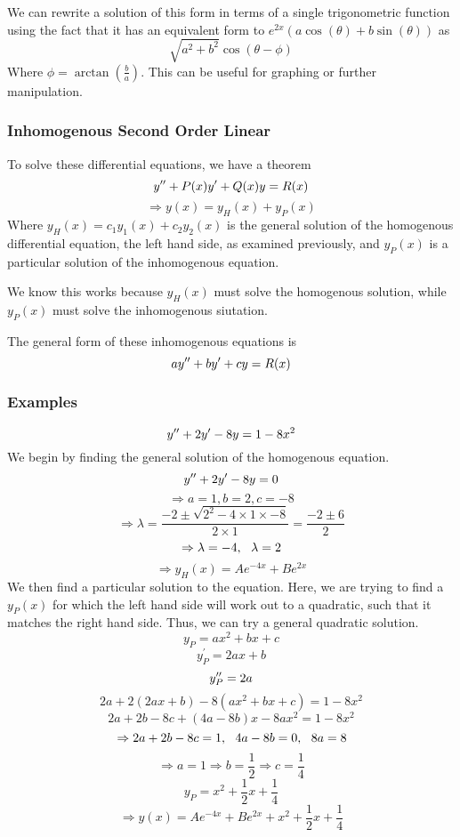 \documentclass[12pt]{report}
\begin{document}
\begin{flushleft}
\bigskip
We can rewrite a solution of this form in terms of a single trigonometric
function using the fact that it has an equivalent form to
\(e^{2x}(a\cos(\theta) + b\sin(\theta))\) as
\[\sqrt{a^2 + b^2}\cos(\theta - \phi)\]
Where \(\phi = \arctan\left(\frac{b}{a}\right)\). This can be useful for
graphing or further manipulation.

\subsubsection*{Inhomogenous Second Order Linear}

To solve these differential equations, we have a theorem
\[y^{\prime\prime} + P(x)y^\prime + Q(x)y = R(x)\]
\[\Rightarrow y(x) = y_H(x) + y_P(x)\]
Where \(y_H(x) = c_1y_1(x) + c_2y_2(x)\) is the general solution of the
homogenous differential equation, the left hand side, as examined previously,
and \(y_P(x)\) is a particular solution of the inhomogenous equation. \par
We know this works because \(y_H(x)\) must solve the homogenous solution, while
\(y_P(x)\) must solve the inhomogenous siutation. \par
The general form of these inhomogenous equations is 
\[ay^{\prime\prime} + by^\prime + cy = R(x)\]

\subsubsection*{Examples}

\begin{center}
    \[y^{\prime\prime} + 2y^\prime - 8y = 1 - 8x^2\]
    We begin by finding the general solution of the homogenous equation.
    \[y^{\prime\prime} + 2y^\prime - 8y = 0\]
    \[\Rightarrow a = 1, b = 2, c = -8\]
    \[\Rightarrow \lambda
    = \frac{-2 \pm \sqrt{2^2 - 4\times1\times-8}}{2\times1}
    = \frac{-2\pm6}{2}\]
    \[\Rightarrow \lambda = -4, \:\:\: \lambda = 2\]
    \[\Rightarrow y_H(x) = Ae^{-4x} + Be^{2x}\]
    We then find a particular solution to the equation. Here, we are trying
    to find a \(y_P(x)\) for which the left hand side will work out to a
    quadratic, such that it matches the right hand side. Thus, we can try
    a general quadratic solution.
    \[y_P = ax^2 + bx + c\]
    \[y_P^\prime = 2ax + b\]
    \[y_P^{\prime\prime} = 2a\]
    \[2a + 2(2ax + b) - 8(ax^2 + bx + c) = 1 - 8x^2\]
    \[2a + 2b - 8c + (4a - 8b)x - 8ax^2 = 1 - 8x^2\]
    \[\Rightarrow 2a + 2b - 8c = 1, \:\:\: 4a - 8b = 0, \:\:\: 8a = 8\]
    \[\Rightarrow a = 1 \Rightarrow b = \frac{1}{2} \Rightarrow
    c = \frac{1}{4}\]
    \[y_P = x^2 + \frac{1}{2}x + \frac{1}{4}\]
    \[\Rightarrow y(x) = Ae^{-4x} + Be^{2x} + x^2 + \frac{1}{2}x +\frac{1}{4}\]
\end{center}


\end{flushleft}
\end{document}
